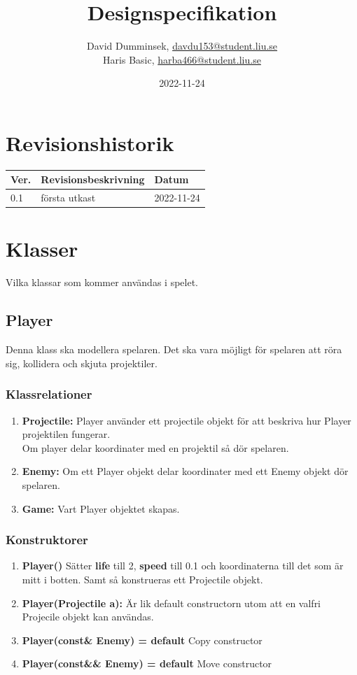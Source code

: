 \documentclass{TDP005mall}
\author{David Dumminsek, \url{davdu153@student.liu.se}\\
  Haris Basic, \url{harba466@student.liu.se}\\}
\title{Designspecifikation}
\date{2022-11-24}
\begin{document}
\projectpage
\section{Revisionshistorik}
\begin{table}[!h]
\begin{tabularx}{\linewidth}{|l|X|l|}
\hline
Ver. & Revisionsbeskrivning & Datum \\\hline
  0.1 & första utkast & 2022-11-24\\\hline
\end{tabularx}
\end{table}


\section{Klasser}
Vilka klassar som kommer användas i spelet.

\subsection{Player}
Denna klass ska modellera spelaren.
Det ska vara möjligt för spelaren att röra sig, kollidera och skjuta projektiler.
\subsubsection*{Klassrelationer}
\begin{enumerate}
  \item \textbf{Projectile:} Player använder ett projectile objekt för att beskriva hur Player projektilen fungerar.\\
                    Om player delar koordinater med en projektil så dör spelaren.
  \item \textbf{Enemy:} Om ett Player objekt delar koordinater med ett Enemy objekt dör spelaren.
  \item \textbf{Game:} Vart Player objektet skapas.
\end{enumerate}
\subsubsection*{Konstruktorer}
\begin{enumerate}
  \item \textbf{Player()} Sätter \textbf{life} till 2, \textbf{speed} till 0.1 och koordinaterna till det som är mitt i botten. Samt så konstrueras ett Projectile objekt.
  \item \textbf{Player(Projectile a):} Är lik default constructorn utom att en valfri Projecile objekt kan användas.
  \item \textbf{Player(const\& Enemy) = default} Copy constructor
  \item \textbf{Player(const\&\& Enemy) = default} Move constructor
\end{enumerate}
\end{document}
